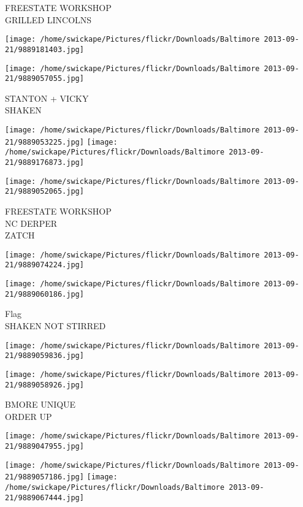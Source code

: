 \documentclass[10pt,letterpaper]{article}
\begin{document}
FREESTATE WORKSHOP\\
GRILLED LINCOLNS\\
\pagebreak

\texttt{[image: /home/swickape/Pictures/flickr/Downloads/Baltimore 2013-09-21/9889181403.jpg]}

\vspace{0.25in}
\texttt{[image: /home/swickape/Pictures/flickr/Downloads/Baltimore 2013-09-21/9889057055.jpg]}

STANTON + VICKY\\
SHAKEN\\
\pagebreak

\texttt{[image: /home/swickape/Pictures/flickr/Downloads/Baltimore 2013-09-21/9889053225.jpg]}
\texttt{[image: /home/swickape/Pictures/flickr/Downloads/Baltimore 2013-09-21/9889176873.jpg]}

\texttt{[image: /home/swickape/Pictures/flickr/Downloads/Baltimore 2013-09-21/9889052065.jpg]}

FREESTATE WORKSHOP\\
NC DERPER\\
ZATCH\\
\pagebreak

\texttt{[image: /home/swickape/Pictures/flickr/Downloads/Baltimore 2013-09-21/9889074224.jpg]}

\vspace{0.25in}
\texttt{[image: /home/swickape/Pictures/flickr/Downloads/Baltimore 2013-09-21/9889060186.jpg]}

Flag\\
SHAKEN NOT STIRRED\\
\pagebreak

\texttt{[image: /home/swickape/Pictures/flickr/Downloads/Baltimore 2013-09-21/9889059836.jpg]}

\vspace{0.25in}
\texttt{[image: /home/swickape/Pictures/flickr/Downloads/Baltimore 2013-09-21/9889058926.jpg]}

BMORE UNIQUE\\
ORDER UP\\
\pagebreak

\texttt{[image: /home/swickape/Pictures/flickr/Downloads/Baltimore 2013-09-21/9889047955.jpg]}

\vspace{0.25in}
\texttt{[image: /home/swickape/Pictures/flickr/Downloads/Baltimore 2013-09-21/9889057186.jpg]}
\texttt{[image: /home/swickape/Pictures/flickr/Downloads/Baltimore 2013-09-21/9889067444.jpg]}
\end{document}
